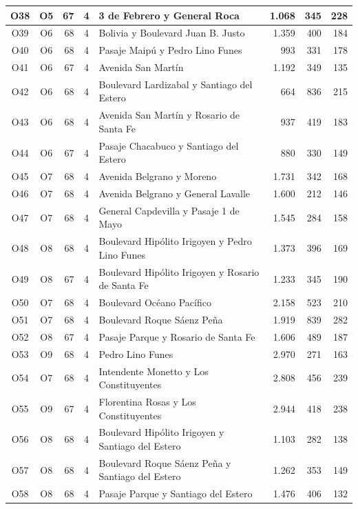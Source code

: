 \begin{longtable}{|c|c|r|c|p{4.2cm}|r|r|r|}
O38 & O5 & 67 & 4 & 3 de Febrero y General Roca & 1.068 & 345 & 228 \\ \hline
O39 & O6 & 68 & 4 & Bolivia y Boulevard Juan B. Justo & 1.359 & 400 & 184 \\ \hline
O40 & O6 & 68 & 4 & Pasaje Maipú y Pedro Lino Funes & 993 & 331 & 178 \\ \hline
O41 & O6 & 67 & 4 & Avenida San Martín & 1.192 & 349 & 135 \\ \hline
O42 & O6 & 68 & 4 & Boulevard Lardizabal y Santiago del Estero & 664 & 836 & 215 \\ \hline
O43 & O6 & 68 & 4 & Avenida San Martín y Rosario de Santa Fe & 937 & 419 & 183 \\ \hline
O44 & O6 & 67 & 4 & Pasaje Chacabuco y Santiago del Estero & 880 & 330 & 149 \\ \hline
O45 & O7 & 68 & 4 & Avenida Belgrano y Moreno & 1.731 & 342 & 168 \\ \hline
O46 & O7 & 68 & 4 & Avenida Belgrano y General Lavalle & 1.600 & 212 & 146 \\ \hline
O47 & O7 & 68 & 4 & General Capdevilla y Pasaje 1 de Mayo & 1.545 & 284 & 158 \\ \hline
O48 & O8 & 68 & 4 & Boulevard Hipólito Irigoyen y Pedro Lino Funes & 1.373 & 396 & 169 \\ \hline
O49 & O8 & 67 & 4 & Boulevard Hipólito Irigoyen y Rosario de Santa Fe & 1.233 & 345 & 190 \\ \hline
O50 & O7 & 68 & 4 & Boulevard Océano Pacífico & 2.158 & 523 & 210 \\ \hline
O51 & O7 & 68 & 4 & Boulevard Roque Sáenz Peña & 1.919 & 839 & 282 \\ \hline
O52 & O8 & 67 & 4 & Pasaje Parque y Rosario de Santa Fe & 1.606 & 489 & 187 \\ \hline
O53 & O9 & 68 & 4 & Pedro Lino Funes & 2.970 & 271 & 163 \\ \hline
O54 & O7 & 68 & 4 & Intendente Monetto y Los Constituyentes & 2.808 & 456 & 239 \\ \hline
O55 & O9 & 67 & 4 & Florentina Rosas y Los Constituyentes & 2.944 & 418 & 238 \\ \hline
O56 & O8 & 68 & 4 & Boulevard Hipólito Irigoyen y Santiago del Estero & 1.103 & 282 & 138 \\ \hline
O57 & O8 & 68 & 4 & Boulevard Roque Sáenz Peña y Santiago del Estero & 1.262 & 353 & 149 \\ \hline
O58 & O8 & 68 & 4 & Pasaje Parque y Santiago del Estero & 1.476 & 406 & 132 \\ \hline

\end{longtable}
